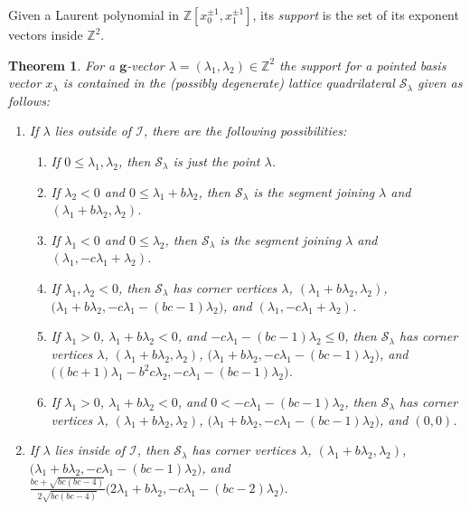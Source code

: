 \documentclass{amsart}
\newtheorem{theorem}{Theorem}
\numberwithin{theorem}{section}
\newcommand{\bfg}{\boldsymbol{g}}
\newcommand{\cI}{\mathcal{I}}
\newcommand{\cS}{\mathcal{S}}
\newcommand{\ZZ}{\mathbb{Z}}
\begin{document}
  Given a Laurent polynomial in $\ZZ[x_0^{\pm1},x_1^{\pm1}]$, its \emph{support} is the set of its exponent vectors inside $\ZZ^2$.
  \begin{theorem}
    \label{th:maximum support}
    For a $\bfg$-vector $\lambda=(\lambda_1,\lambda_2)\in\ZZ^2$ the support for a pointed basis vector $x_\lambda$ is contained in the (possibly degenerate) lattice quadrilateral $\cS_\lambda$ given as follows:
    \begin{enumerate}
      \item If $\lambda$ lies outside of $\cI$, there are the following possibilities:
        \begin{enumerate}
          \item If $0\le\lambda_1,\lambda_2$, then $\cS_\lambda$ is just the point $\lambda$.
          \item If $\lambda_2 < 0$ and $0\le\lambda_1+b\lambda_2$, then $\cS_\lambda$ is the segment joining $\lambda$ and $(\lambda_1+b\lambda_2,\lambda_2)$.
          \item If $\lambda_1 < 0$ and $0\le\lambda_2$, then $\cS_\lambda$ is the segment joining $\lambda$ and $(\lambda_1,-c\lambda_1+\lambda_2)$.
          \item If $\lambda_1,\lambda_2 < 0$, then $\cS_\lambda$ has corner vertices $\lambda$, $(\lambda_1+b\lambda_2,\lambda_2)$, $\big(\lambda_1+b\lambda_2,-c\lambda_1-(bc-1)\lambda_2\big)$, and $(\lambda_1,-c\lambda_1+\lambda_2)$.
          \item If $\lambda_1 > 0$, $\lambda_1+b\lambda_2 < 0$, and $-c\lambda_1-(bc-1)\lambda_2\le 0$, then $\cS_\lambda$ has corner vertices $\lambda$, $(\lambda_1+b\lambda_2,\lambda_2)$, $\big(\lambda_1+b\lambda_2,-c\lambda_1-(bc-1)\lambda_2\big)$, and $\big((bc+1)\lambda_1-b^2c\lambda_2,-c\lambda_1-(bc-1)\lambda_2\big)$.
          \item If $\lambda_1 > 0$, $\lambda_1+b\lambda_2 < 0$, and $0 < -c\lambda_1-(bc-1)\lambda_2$, then $\cS_\lambda$ has corner vertices $\lambda$, $(\lambda_1+b\lambda_2,\lambda_2)$, $\big(\lambda_1+b\lambda_2,-c\lambda_1-(bc-1)\lambda_2\big)$, and $(0,0)$.
        \end{enumerate}
      \item If $\lambda$ lies inside of $\cI$, then $\cS_\lambda$ has corner vertices $\lambda$, $(\lambda_1+b\lambda_2,\lambda_2)$, $\big(\lambda_1+b\lambda_2,-c\lambda_1-(bc-1)\lambda_2\big)$, and $\frac{bc+\sqrt{bc(bc-4)}}{2\sqrt{bc(bc-4)}}\big(2\lambda_1+b\lambda_2,-c\lambda_1-(bc-2)\lambda_2\big)$.
    \end{enumerate}
  \end{theorem}
\end{document}
